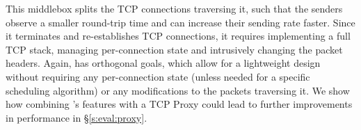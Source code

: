 
 This middlebox splits the TCP connections traversing it, such that the senders observe a smaller round-trip time and can increase their sending rate faster. Since it terminates and re-establishes TCP connections, it requires implementing a full TCP stack, managing per-connection state and intrusively changing the packet headers. Again, \name has orthogonal goals, which allow for a lightweight design without requiring any per-connection state (unless needed for a specific scheduling algorithm) or any modifications to the packets traversing it. We show how combining \name's features with a TCP Proxy could lead to further improvements in performance in \S\ref{s:eval:proxy}. 


